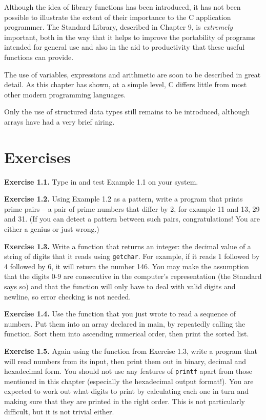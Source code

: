   Although the idea of library functions has been introduced, it has not
   been possible to illustrate the extent of their importance to the C
   application programmer. The Standard Library, described in Chapter 9, is \textit{extremely} important, both in the way that it helps to
   improve the portability of programs intended for general use and also in
   the aid to productivity that these useful functions can provide.


  The use of variables, expressions and arithmetic are soon to be described
   in great detail. As this chapter has shown, at a simple level, C differs
   little from most other modern programming languages.


  Only the use of structured data types still remains to be introduced,
   although arrays have had a very brief airing.


 
        \section{Exercises}
        


  \textbf{Exercise 1.1.} Type in and test Example 1.1 on your
   system.


  \textbf{Exercise 1.2.} Using Example 1.2 as a pattern, write a
   program that prints prime pairs -- a pair of prime numbers that differ
   by 2, for example 11 and 13, 29 and 31. (If you can detect a pattern
   between such pairs, congratulations! You are either a genius or just
   wrong.)


  \textbf{Exercise 1.3.} Write a function that returns an integer: the decimal
   value of a string of digits that it reads using \texttt{getchar}. For
   example, if it reads 1 followed by 4 followed by 6, it will
   return the number 146.  You may make the assumption that the
   digits 0-9 are consecutive in the computer's representation (the
   Standard says so) and that the function will only have to deal with valid
   digits and newline, so error checking is not needed.


  \textbf{Exercise 1.4.} Use the function that you just wrote to read a sequence
   of numbers.  Put them into an array declared in main, by repeatedly calling
   the function. Sort them into ascending numerical order, then print the
   sorted list.


  \textbf{Exercise 1.5.} Again using the function from Exercise 1.3, write a
   program that will read numbers from its input, then print them out in
   binary, decimal and hexadecimal form. You should not use any features of
   \texttt{printf} apart from those mentioned in this chapter (especially
   the hexadecimal output format!). You are expected to work out what digits
   to print by calculating each one in turn and making sure that they are
   printed in the right order. This is not particularly difficult, but it is
   not trivial either.


